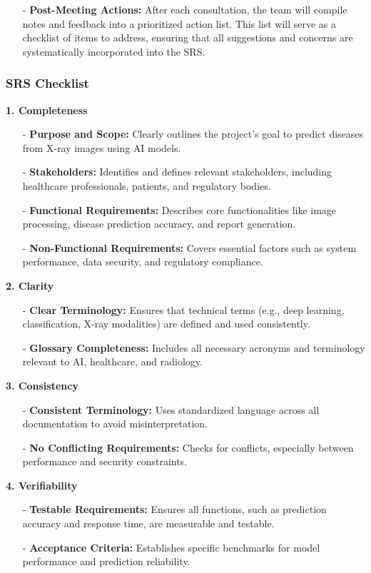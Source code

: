 \documentclass[12pt, titlepage]{article}
\begin{document}
\begin{itemize}
    \item[-] \textbf{Post-Meeting Actions:} After each consultation, the team will compile notes and feedback into a prioritized action list. This list will serve as a checklist of items to address, ensuring that all suggestions and concerns are systematically incorporated into the SRS.
\end{itemize}

\subsubsection{SRS Checklist}
\textbf{1. Completeness}
\begin{itemize}
    \item[-] \textbf{Purpose and Scope:} Clearly outlines the project’s goal to predict diseases from X-ray images using AI models. 
    \item[-] \textbf{Stakeholders:} Identifies and defines relevant stakeholders, including healthcare professionals, patients, and regulatory bodies. 
    \item[-] \textbf{Functional Requirements:} Describes core functionalities like image processing, disease prediction accuracy, and report generation. 
    \item[-] \textbf{Non-Functional Requirements:} Covers essential factors such as system performance, data security, and regulatory compliance. 
\end{itemize}
\textbf{2. Clarity} 
\begin{itemize}
    \item[-] \textbf{Clear Terminology:} Ensures that technical terms (e.g., deep learning, classification, X-ray modalities) are defined and used consistently. 
    \item[-] \textbf{Glossary Completeness:} Includes all necessary acronyms and terminology relevant to AI, healthcare, and radiology. 
\end{itemize}
\textbf{3. Consistency} 
\begin{itemize}
    \item[-] \textbf{Consistent Terminology:} Uses standardized language across all documentation to avoid misinterpretation. 
    \item[-] \textbf{No Conflicting Requirements:} Checks for conflicts, especially between performance and security constraints. 
\end{itemize}
\textbf{4. Verifiability} 
\begin{itemize}
    \item[-] \textbf{Testable Requirements:} Ensures all functions, such as prediction accuracy and response time, are measurable and testable. 
    \item[-] \textbf{Acceptance Criteria:} Establishes specific benchmarks for model performance and prediction reliability. 
\end{itemize}
\end{document}
